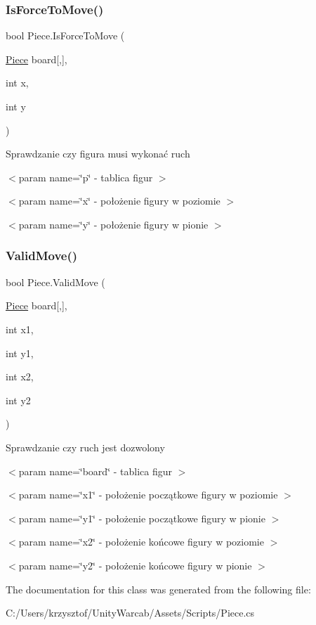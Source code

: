 \subsubsection{\texorpdfstring{IsForceToMove()}{IsForceToMove()}}
{\footnotesize\ttfamily bool Piece.\+Is\+Force\+To\+Move (\begin{DoxyParamCaption}\item[{\mbox{\hyperlink{class_piece}{Piece}}}]{board\mbox{[},\mbox{]},  }\item[{int}]{x,  }\item[{int}]{y }\end{DoxyParamCaption})}



Sprawdzanie czy figura musi wykonać ruch 

$<$param name=\char`\"{}p\char`\"{} -\/ tablica figur $>$

$<$param name=\char`\"{}x\char`\"{} -\/ położenie figury w poziomie $>$

$<$param name=\char`\"{}y\char`\"{} -\/ położenie figury w pionie $>$\mbox{\label{class_piece_a0ef5bca84cf0f16a7f2a1d3008a3449d}} 
\subsubsection{\texorpdfstring{ValidMove()}{ValidMove()}}
{\footnotesize\ttfamily bool Piece.\+Valid\+Move (\begin{DoxyParamCaption}\item[{\mbox{\hyperlink{class_piece}{Piece}}}]{board\mbox{[},\mbox{]},  }\item[{int}]{x1,  }\item[{int}]{y1,  }\item[{int}]{x2,  }\item[{int}]{y2 }\end{DoxyParamCaption})}



Sprawdzanie czy ruch jest dozwolony 

$<$param name=\char`\"{}board\char`\"{} -\/ tablica figur $>$

$<$param name=\char`\"{}x1\char`\"{} -\/ położenie początkowe figury w poziomie $>$

$<$param name=\char`\"{}y1\char`\"{} -\/ położenie początkowe figury w pionie $>$

$<$param name=\char`\"{}x2\char`\"{} -\/ położenie końcowe figury w poziomie $>$

$<$param name=\char`\"{}y2\char`\"{} -\/ położenie końcowe figury w pionie $>$

The documentation for this class was generated from the following file\+:\begin{DoxyCompactItemize}
\item 
C\+:/\+Users/krzysztof/\+Unity\+Warcab/\+Assets/\+Scripts/Piece.\+cs\end{DoxyCompactItemize}
